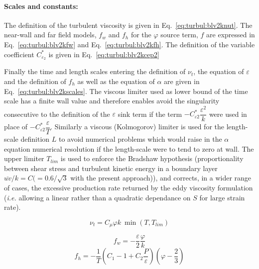 \paragraph{Scales and constants:}

The definition of the turbulent viscosity is given in Eq.~\eqref{eq:turbul:blv2knut}.
The near-wall and far field models, $f_w$ and $f_h$ for the $\varphi$ source term, $f$ are
expressed in Eq.~\eqref{eq:turbul:blv2kfw} and Eq.~\eqref{eq:turbul:blv2kfh}.
The definition of the variable coefficient $C_{\varepsilon_2}^*$ is given in Eq.~\eqref{eq:turbul:blv2kcep2}

Finally the time and length scales entering the definition of $\nu_t$, the equation of
$\varepsilon$ and the definition of $f_h$ as well as the equation of $\alpha$ are given in
Eq.~\eqref{eq:turbul:blv2kscales}. The viscous limiter used as lower bound of the time scale
has a finite wall value and therefore enables avoid the singularity consecutive to the definition
of the $\varepsilon$ sink term if the term $-C_{\varepsilon 2}^* \dfrac{\varepsilon^2}{k}$ were
used in place of $-C_{\varepsilon 2}^* \dfrac{\varepsilon}{T}$.
Similarly a viscous (Kolmogorov) limiter is used for the length-scale definition $L$ to
avoid numerical problems which would raise in the $\alpha$ equation numerical resolution
if the length-scale were to tend to zero at wall. The upper limiter $T_{lim}$ is used to
enforce the Bradshaw hypothesis (proportionality between shear stress and turbulent
kinetic energy in a boundary layer $\overline{uv}/k=C (=0.6/\sqrt{3}$ with the present approach)),
and corrects, in a wider range of cases, the excessive production rate returned by
the eddy viscosity formulation (\emph{i.e.} allowing a linear rather than a quadratic
dependance on $S$ for large strain rate).

\begin{equation}
	\nu_t= C_\mu \varphi k ~ \min(T,T_{lim})
\label{eq:turbul:blv2knut}
\end{equation}

\begin{equation}
f_w = - \dfrac{\varepsilon}{2} \dfrac{\varphi}{k}
\label{eq:turbul:blv2kfw}
\end{equation}
\begin{equation}
f_h = - \dfrac{1}{T} \left(  C_1 -1 +C_2 \dfrac{P}{\varepsilon}   \right) \left(  \varphi - \dfrac{2}{3}  \right)
\label{eq:turbul:blv2kfh}
\end{equation}

